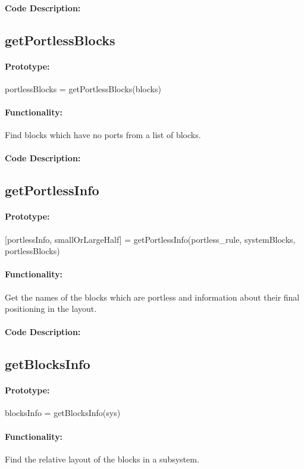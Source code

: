 \documentclass[12pt,letterpaper]{report}
\begin{document}
\paragraph{Code Description:}

\subsection{getPortlessBlocks}
\paragraph{Prototype:} portlessBlocks = getPortlessBlocks(blocks)
\paragraph{Functionality:} Find blocks which have no ports from a list of blocks.
\paragraph{Code Description:}

\subsection{getPortlessInfo}
\paragraph{Prototype:} [portlessInfo, smallOrLargeHalf] = getPortlessInfo(portless\_rule, systemBlocks, portlessBlocks)
\paragraph{Functionality:} Get the names of the blocks which are portless and information about their final positioning in the layout.
\paragraph{Code Description:}

\subsection{getBlocksInfo}
\paragraph{Prototype:} blocksInfo = getBlocksInfo(sys)
\paragraph{Functionality:} Find the relative layout of the blocks in a subsystem.
\end{document}
